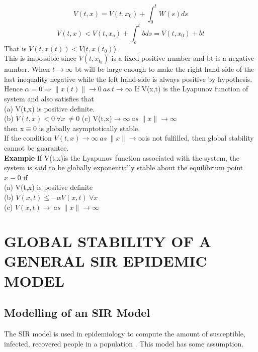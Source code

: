 \documentclass[a4paper,12pt]{report}
\numberwithin{equation}{section}
\begin{document}
\begin{equation*}
  V(t,x) =V(t,x_{0})+\displaystyle{\int_{0}^{t}}W(s)ds
\end{equation*}
\begin{equation*}
    V(t,x) <V(t,x_{o}) + \displaystyle{\int_{o}^{t}b ds}= V(t,x_{0}) + bt
\end{equation*}
That is $ V(t,x(t)) < V(t,x(t_{0})$).\\
This is impossible since $V(t,x_{t_0})$ is a fixed positive number and bt is a negative number. When $t\to \infty$ bt will be large enough to make the right hand-side of the last inequality negative while the left hand-side is always positive by hypothesis. Hence $\alpha=0 \Longrightarrow \|x(t)\|\to 0 \ as \ t\to \infty $
\theorem If V(x,t) is the Lyapunov function of system and also satisfies that \\
(a) V(t,x) is positive definite.\\
(b) $\dot{V}(t,x)<0 \ \forall x \ \neq 0$
(c) V(t,x)$\to \infty \ as \ \|x\| \to \infty$ \\
then x$\equiv$0 is globally asymptotically stable. \\
If the condition $V(t,x)\to \infty \ as \  \|x\| \to \infty$is not fulfilled, then global stability cannot be guarantee. \\
\textbf{Example} 
\theorem If V(t,x)is the Lyapunov function associated with the system, the system is said to be globally exponentially stable about the equilibrium point $x\equiv 0$ if \\
(a) V(t,x) is positive definite \\
(b) $\dot{V}(x,t)\leq - \alpha V(x,t) \ \forall x $ \\
(c) $V(x,t)\to \ as \ \|x\| \to \infty$
\chapter{GLOBAL STABILITY OF A GENERAL SIR EPIDEMIC MODEL}
\section{Modelling of an SIR Model}

The SIR model is used in epidemiology to compute the amount of susceptible, infected, recovered people in a population . This model has some assumption.
\end{document}
